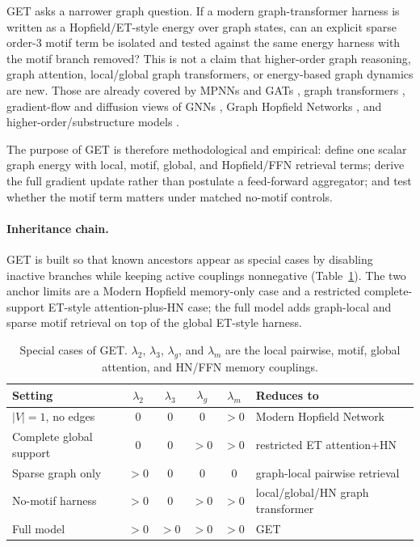 \documentclass[11pt,a4paper]{article}
\begin{document}
GET asks a narrower graph question. If a modern graph-transformer harness is
written as a Hopfield/ET-style energy over graph states, can an explicit sparse
order-3 motif term be isolated and tested against the same energy harness with
the motif branch removed? This is not a claim that higher-order graph
reasoning, graph attention, local/global graph transformers, or energy-based
graph dynamics are new. Those are already covered by
MPNNs and GATs \citep{gilmer2017neural,velickovic2018graph}, graph
transformers \citep{ying2021graphormer,rampasek2022gps,ma2023grit,
shirzad2023exphormer}, gradient-flow and diffusion views of GNNs
\citep{digiovanni2023gnnflow,wu2025diffusion}, Graph Hopfield Networks
\citep{rao2026graph}, and higher-order/substructure models
\citep{morris2019weisfeiler,bouritsas2023subgraph,bodnar2021mpsn,
hussain2024triplet}.

The purpose of GET is therefore methodological and empirical: define one scalar
graph energy with local, motif, global, and Hopfield/FFN retrieval terms;
derive the full gradient update rather than postulate a feed-forward
aggregator; and test whether the motif term matters under matched no-motif
controls.

\paragraph{Inheritance chain.}
GET is built so that known ancestors appear as special cases by disabling
inactive branches while keeping active couplings nonnegative
(Table~\ref{tab:special-cases}). The two anchor limits are a Modern Hopfield
memory-only case and a restricted complete-support ET-style attention-plus-HN
case; the full model adds graph-local and sparse motif retrieval on top of the
global ET-style harness.

\begin{table}[htbp]
\centering
\caption{Special cases of GET. $\lambda_2$, $\lambda_3$, $\lambda_g$, and
$\lambda_m$ are the local pairwise, motif, global attention, and HN/FFN memory
couplings.}
\label{tab:special-cases}
\renewcommand{\arraystretch}{1.2}
\begin{tabular}{lcccc l}
\toprule
Setting & $\lambda_2$ & $\lambda_3$ & $\lambda_g$ & $\lambda_m$ & Reduces to \\
\midrule
$|V|=1$, no edges & $0$ & $0$ & $0$ & $>0$ & Modern Hopfield Network \citep{ramsauer2021hopfield} \\
Complete global support & $0$ & $0$ & $>0$ & $>0$ & restricted ET attention+HN \citep{hoover2023energy} \\
Sparse graph only & $>0$ & $0$ & $0$ & $0$ & graph-local pairwise retrieval \\
No-motif harness & $>0$ & $0$ & $>0$ & $>0$ & local/global/HN graph transformer \\
Full model & $>0$ & $>0$ & $>0$ & $>0$ & GET \\
\bottomrule
\end{tabular}
\end{table}
\end{document}

